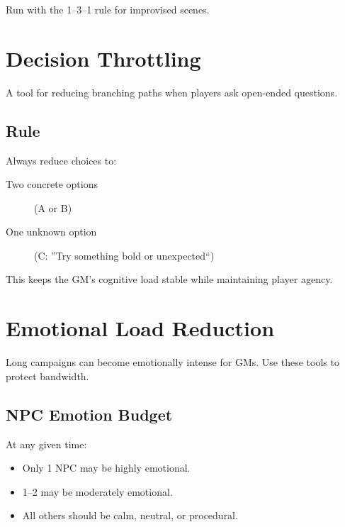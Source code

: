 \documentclass[11pt]{article}
\begin{document}
Run with the 1--3--1 rule for improvised scenes.


\section{Decision Throttling}
\label{appendix:decision-throttling}

A tool for reducing branching paths when players ask open-ended questions.

\subsection{Rule}

Always reduce choices to:
\begin{description}
    \item[Two concrete options] (A or B)
    \item[One unknown option] (C: ''Try something bold or unexpected``)
\end{description}

This keeps the GM's cognitive load stable while maintaining player agency.


\section{Emotional Load Reduction}
\label{appendix:emotional-load}

Long campaigns can become emotionally intense for GMs. Use these tools to protect bandwidth.

\subsection{NPC Emotion Budget}

At any given time:
\begin{itemize}
    \item Only 1 NPC may be highly emotional.
    \item 1--2 may be moderately emotional.
    \item All others should be calm, neutral, or procedural.
\end{itemize}
\end{document}
